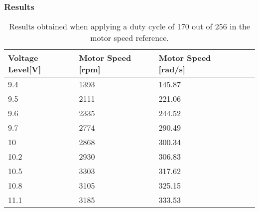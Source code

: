 \subsubsection{Results}
\begin{table}[H]
	\centering
	\begin{tabular}{|l|l|l|l|p{4.3cm}|}
		\hline%
		\textbf{Voltage Level[V]}    & \textbf{Motor Speed [rpm]} & \textbf{Motor Speed [rad/s]} \\ 
		\hline%
		9.4                & 1393         	   &  145.87                                       \\
		\hline%
		 9.5      &  2111 						       &  221.06				                \\
		\hline%
		 9.6       &  2335                               &  244.52   			                  \\
		\hline%
		9.7    & 2774                               &  290.49  			                       \\
		\hline%
		10   &    2868                               &  300.34                                 \\
		\hline%
		10.2   &  2930 						       &  306.83				                   \\
		\hline%
		10.5 &  3303                               &  317.62    			                    \\
		\hline%
		 10.8   &    3105                               &  325.15                               \\
		\hline%
		11.1     &  3185 						       &  333.53				                \\
		\hline%
	\end{tabular}
	\caption{Results obtained when applying a duty cycle of 170 out of 256 in the motor speed reference.}
\end{table}
